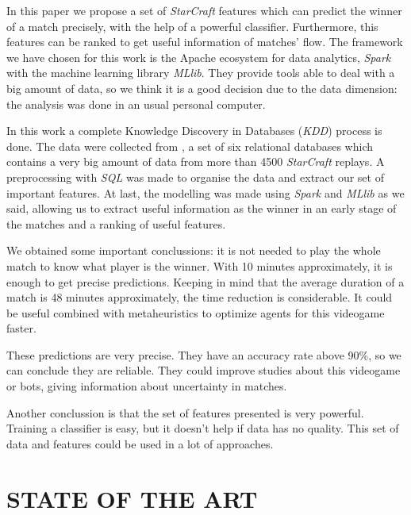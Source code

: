 \documentclass[a4paper,twoside]{article}
\begin{document}

In this paper we propose a set of \emph{StarCraft} features which can predict
the winner of a match precisely, with the help of a powerful classifier.
Furthermore, this features can be ranked to
get useful information of matches' flow. The framework we have chosen for this
work is the Apache ecosystem for data analytics, \emph{Spark} with the machine
learning library \emph{MLlib}. They provide tools able to deal with a big
amount of data, so we think it is a good decision due to the data dimension:
the analysis was done in an usual personal computer.


In this work a complete Knowledge Discovery in Databases (\emph{KDD}) process
is done. The data were collected from \cite{DBLP:conf/flairs/RobertsonW14},
a set of six relational databases which contains a very big amount of data
from more than 4500 \emph{StarCraft} replays. A preprocessing with \emph{SQL}
was made to organise the data and extract our set of important features. At
last, the modelling was made using \emph{Spark} and \emph{MLlib} as we said,
allowing us to extract useful information as the winner in an early stage of
the matches and a ranking of useful features.


We obtained some important conclussions: it is not needed to play the whole
match to know what player is the winner. With 10 minutes approximately, it is
enough to get precise predictions. Keeping in mind that the average duration
of a match is 48 minutes approximately, the time reduction is considerable. It
could be useful combined with metaheuristics to optimize agents for this
videogame faster.

These predictions are very precise. They have an accuracy rate above 90\%, so
we can conclude they are reliable. They could improve studies about this
videogame or bots, giving information about uncertainty in matches.

Another conclussion is that the set of features presented is very powerful.
Training a classifier is easy, but it doesn't help if data has no quality.
This set of data and features could be used in a lot of approaches.

\cite{DBLP:conf/evoW/Fernandez-AresG16}

\section{\uppercase{State of the art}}
\label{sec:state}
\end{document}
